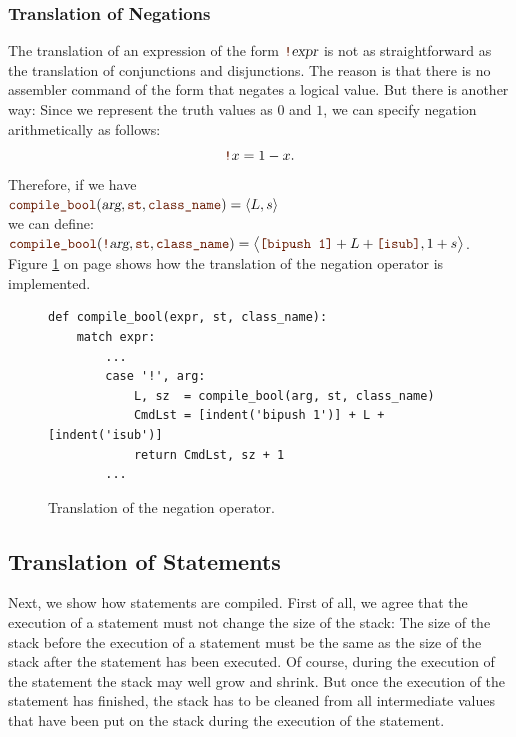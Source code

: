 \subsubsection{Translation of Negations}
The translation of an expression of the form $\mytt{!}\textsl{expr}$ is not as straightforward as the
translation of conjunctions and disjunctions.  The reason is that there is no assembler command of
the form  that negates a logical value.  But there is another way: Since we represent the truth
values as $0$ and $1$, we can specify negation arithmetically as follows:
\[ \mytt{!}x = 1 - x. \]
Therefore, if we have
\\[0.2cm]
\hspace*{1.3cm}
$\mytt{compile\_bool}(\textsl{arg}, \mytt{st}, \mytt{class\_name}) = \pair(L, s)$
\\[0.2cm]
we can define:
\\[0.2cm]
\hspace*{1.3cm}
$\mytt{compile\_bool}(\mytt{!}\textsl{arg}, \mytt{st}, \mytt{class\_name})
= \bigl\langle \mytt{[bipush 1]} + L + \mytt{[isub]}, 1 + s \bigr\rangle$.
\\[0.2cm]
Figure \ref{fig:Compiler.ipynb:compile:not} on page \pageref{fig:Compiler.ipynb:compile:not} shows how the
translation of the negation operator is implemented.

\begin{figure}[!ht]
\centering
\begin{verbatim}
def compile_bool(expr, st, class_name):
    match expr:
        ...
        case '!', arg:
            L, sz  = compile_bool(arg, st, class_name)
            CmdLst = [indent('bipush 1')] + L + [indent('isub')]
            return CmdLst, sz + 1
        ...
\end{verbatim}
\vspace*{-0.3cm}
\caption{Translation of the negation operator.}
\label{fig:Compiler.ipynb:compile:not}
\end{figure}


\subsection{Translation of Statements}
Next, we show how statements are compiled.  First of all, we agree that the execution of a statement
must not change the size of the stack:  The size of the stack before the execution of a statement must
be the same as the size of the stack after the statement has been executed.
Of course, during the execution of the statement the stack may well
grow and shrink.  But once the execution of the statement has finished, the stack has to be cleaned from all
intermediate values that have been put on the stack during the execution of the statement.


